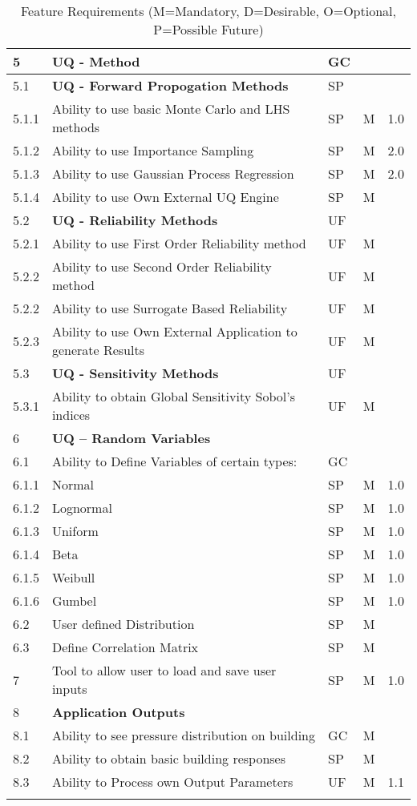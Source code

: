 \begin{longtable}{| p{} | p{} | p{} | p{} |  p{} |}
	5 & \textbf{UQ - Method} &  GC &  \\ \hline
	5.1 & \textbf{UQ - Forward Propogation Methods} & SP  &  \\ \hline
	5.1.1 & Ability to use basic  Monte Carlo and LHS methods & SP & M & 1.0 \\ \hline
	5.1.2 & Ability to use Importance Sampling  & SP & M & 2.0 \\ \hline
	5.1.3 & Ability to use Gaussian Process Regression & SP & M & 2.0 \\ \hline
	5.1.4 & Ability to use Own External UQ Engine & SP & M &  \\ \hline
	5.2 & \textbf{UQ - Reliability Methods} & UF &  &  \\ \hline
	5.2.1 & Ability to use First Order Reliability method & UF & M &  \\ \hline
	5.2.2 & Ability to use Second Order Reliability method & UF & M & \\ \hline
	5.2.2 & Ability to use Surrogate Based Reliability & UF & M & \\ \hline
	5.2.3 & Ability to use Own External Application to generate Results & UF & M &  \\ \hline
	5.3 & \textbf{UQ - Sensitivity Methods} & UF &  &  \\ \hline
	5.3.1 & Ability to obtain Global Sensitivity Sobol's indices & UF & M &  \\ \hline
    6 & \textbf{UQ – Random Variables} &  &  \\ \hline
    6.1 & Ability to Define Variables of certain types: & GC &  &  \\ 
    6.1.1 &  Normal & SP & M  & 1.0 \\ \hline
    6.1.2 &  Lognormal & SP & M & 1.0 \\ \hline
    6.1.3 & Uniform & SP & M & 1.0  \\ \hline
    6.1.4 & Beta & SP & M & 1.0 \\ \hline
    6.1.5 & Weibull &  SP & M  & 1.0 \\ \hline
    6.1.6 & Gumbel &  SP & M & 1.0  \\ \hline
    6.2 & User defined Distribution & SP & M &  \\ \hline
    6.3 & Define Correlation Matrix & SP & M &  \\ \hline
     7 & Tool to allow user to load and save user inputs & SP & M & 1.0 \\ \hline
    8 & \textbf{Application Outputs} &  &  \\ \hline
    8.1 & Ability to see pressure distribution on building & GC & M &   \\ \hline
    8.2 & Ability to obtain basic building responses & SP & M &   \\ \hline
    8.3 & Ability to Process own Output Parameters & UF & M & 1.1  \\ \hline
	\bottomrule 
\caption{Feature Requirements (M=Mandatory, D=Desirable, O=Optional, P=Possible Future)}             
  \label{tab:featureRequirements}                 
\end{longtable}

